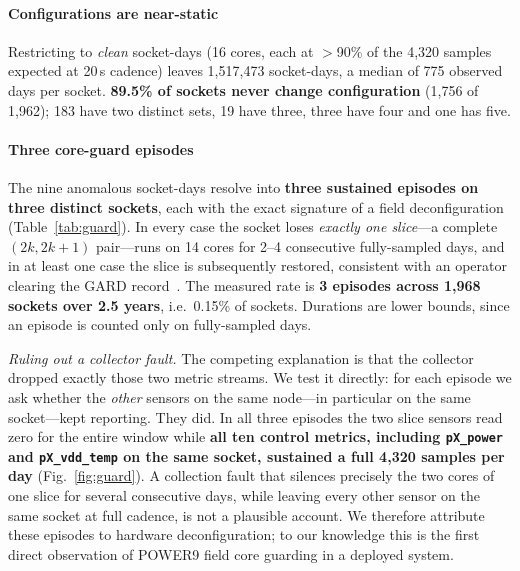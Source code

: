 \documentclass[10pt,conference]{IEEEtran}
\begin{document}
\paragraph{Configurations are near-static} Restricting to \emph{clean} socket-days (16 cores, each
at $>$90\% of the 4{,}320 samples expected at 20\,s cadence) leaves 1{,}517{,}473 socket-days, a
median of 775 observed days per socket. \textbf{89.5\% of sockets never change configuration}
(1{,}756 of 1{,}962); 183 have two distinct sets, 19 have three, three have four and one has five.

\paragraph{Three core-guard episodes} The nine anomalous socket-days resolve into
\textbf{three sustained episodes on three distinct sockets}, each with the exact signature of a
field deconfiguration (Table~\ref{tab:guard}). In every case the socket loses \emph{exactly one
slice}---a complete $(2k,2k{+}1)$ pair---runs on 14 cores for 2--4 consecutive fully-sampled days,
and in at least one case the slice is subsequently restored, consistent with an operator clearing
the GARD record~\cite{skiboot_gard}. The measured rate is \textbf{3 episodes across 1{,}968
sockets over 2.5 years}, i.e.\ 0.15\% of sockets. Durations are lower bounds, since an episode is
counted only on fully-sampled days.

\emph{Ruling out a collector fault.} The competing explanation is that the collector dropped
exactly those two metric streams. We test it directly: for each episode we ask whether the
\emph{other} sensors on the same node---in particular on the same socket---kept reporting. They
did. In all three episodes the two slice sensors read zero for the entire window while
\textbf{all ten control metrics, including \texttt{pX\_power} and \texttt{pX\_vdd\_temp} on the
same socket, sustained a full 4{,}320 samples per day} (Fig.~\ref{fig:guard}). A collection fault
that silences precisely the two cores of one slice for several consecutive days, while leaving
every other sensor on the same socket at full cadence, is not a plausible account. We therefore
attribute these episodes to hardware deconfiguration; to our knowledge this is the first direct
observation of POWER9 field core guarding in a deployed system.
\end{document}
